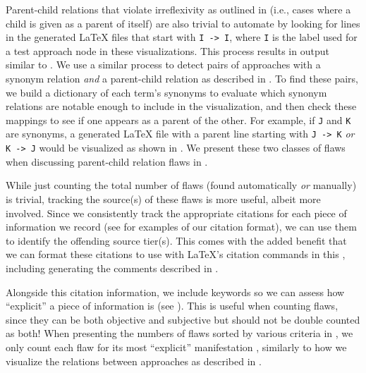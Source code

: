 \ExampleFlawGraphs{}

\label{autoSelfPar}
Parent-child relations that violate irreflexivity as outlined in
 (i.e., cases where a child is given as a parent of itself)
are also trivial to automate by looking for lines in the generated \LaTeX{}
files that start with \texttt{I~->~I}, where \texttt{I} is the label used for a
test approach node in these visualizations. This process results in output
similar to .%
\label{autoParSyn} We use a similar process to detect pairs of
approaches with a synonym relation \emph{and} a parent-child relation as
described in . To find these pairs, we build a dictionary of
each term's synonyms to evaluate which synonym relations are notable enough
to include in the visualization, and then check these mappings to see if one
appears as a parent of the other. For example, if \texttt{J} and \texttt{K} are
synonyms, a generated \LaTeX{} file with a parent line starting with
\texttt{J~->~K} \emph{or} \texttt{K~->~J} would be visualized as shown in
. We present these two
classes of flaws when discussing parent-child relation flaws in .

While just counting the total number of flaws (found automatically \emph{or}
manually) is trivial, tracking
the source(s) of these flaws is more useful, albeit more involved. Since
we consistently track the appropriate citations for each piece of information
we record (see  for examples
of our citation format), we can use them to
identify the offending source tier(s). This comes with the added benefit that
we can format these citations to use with \LaTeX{}'s citation commands in this
\docType{}, including generating the comments described in
.

\label{auto-flaw-detect-explicitness}
Alongside this citation information, we include keywords so we can assess how
``explicit'' a piece of information is (see ). This is
useful when counting flaws, since they can be both objective and subjective but
should not be double counted as both! When presenting
the numbers of flaws sorted by various criteria in ,
we only count each flaw for its most ``explicit'' manifestation%
, similarly to how we visualize the relations
between approaches as described in .

